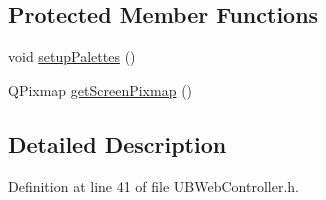 \subsection*{Protected Member Functions}
\begin{DoxyCompactItemize}
\item 
void \hyperlink{class_u_b_web_controller_af73cfa36d5b743fa3a652e49dd7e4831}{setup\-Palettes} ()
\item 
Q\-Pixmap \hyperlink{class_u_b_web_controller_a3145d1ed63fb290f52d3fcd27e7e83bd}{get\-Screen\-Pixmap} ()
\end{DoxyCompactItemize}


\subsection{Detailed Description}


Definition at line 41 of file U\-B\-Web\-Controller.\-h.



